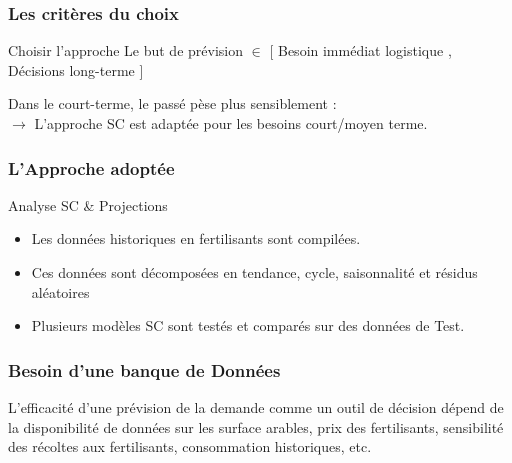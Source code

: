 \documentclass{beamer}
\begin{document}
	\begin{frame}
	\frametitle{Les critères du choix}
	
	\begin{block}{Choisir l'approche}
	Le but de prévision $ \in $ \footnotesize{ [ Besoin immédiat logistique , Décisions long-terme ] }
	 \\
	\begin{block}{}
	\small{Dans le court-terme, le passé pèse plus sensiblement : \\ $\rightarrow$  L'approche SC est adaptée pour les besoins court/moyen terme.}
		\end{block}
		\end{block}

	\end{frame}
	\begin{frame}
	\frametitle{L'Approche adoptée}
	
	\begin{block}{Analyse SC \& Projections}
	\begin{itemize}
	\item Les données historiques en fertilisants sont compilées.
	\item Ces données sont décomposées en tendance, cycle, saisonnalité et résidus aléatoires 
	\item Plusieurs modèles SC sont testés et comparés sur des données de Test.
	\end{itemize}
	\end{block}
	\end{frame}
\begin{frame}
\frametitle{Besoin d'une banque de Données}
\begin{block}{}
\footnotesize{L'efficacité d'une prévision de la demande comme un outil de décision dépend de la disponibilité de données sur les surface arables, prix des fertilisants, sensibilité des récoltes aux fertilisants, consommation historiques, etc.}

\end{block}
\end{frame}
\end{document}
